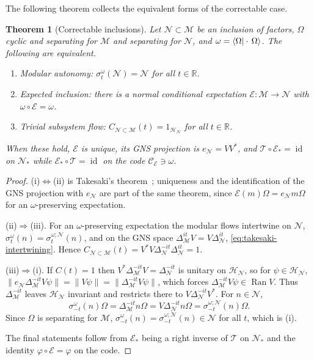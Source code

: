 \documentclass[a4paper,11pt]{article}
\newtheorem{theorem}{Theorem}
\theoremstyle{definition}
\newcommand{\mN}{\mathcal{N}}
\newcommand{\mH}{\mathcal{H}}
\newcommand{\mM}{\mathcal{M}}
\newcommand{\mE}{\mathcal{E}}
\begin{document}
The following theorem collects the equivalent forms of the correctable case.
\begin{theorem}[Correctable inclusions]\label{thm:correctable}
Let $\mN\subset\mM$ be an inclusion of factors, $\Omega$ cyclic and separating for $\mM$ and separating for $\mN$, and $\omega=\braket{\Omega|\cdot\,\Omega}$. The following are equivalent.
\begin{enumerate}
 \item[\rm(i)] \emph{Modular autonomy:} $\sigma^{\omega}_t(\mN)=\mN$ for all $t\in\mathbb R$.
 \item[\rm(ii)] \emph{Expected inclusion:} there is a normal conditional expectation $\mE:\mM\to\mN$ with $\omega\circ\mE=\omega$.
 \item[\rm(iii)] \emph{Trivial subsystem flow:} $C_{\mN\subset\mM}(t)=1_{\mH_{\mN}}$ for all $t\in\mathbb R$.
\end{enumerate}
When these hold, $\mE$ is unique, its GNS projection is $e_{\mN}=VV^*$, and $\mathcal T\circ\mE_*=\operatorname{id}$ on $\mN_*$ while $\mE_*\circ\mathcal T=\operatorname{id}$ on the code $\mathcal C_{\mE}\ni\omega$.
\end{theorem}

\begin{proof}
(i)$\Leftrightarrow$(ii) is Takesaki's theorem~\cite{Takesaki1972}; uniqueness and the identification of the GNS projection with $e_{\mN}$ are part of the same theorem, since $\mE(m)\Omega=e_{\mN}m\Omega$ for an $\omega$-preserving expectation.

(ii)$\Rightarrow$(iii). For an $\omega$-preserving expectation the modular flows intertwine on $\mN$,
$\sigma^{\omega}_t(n)=\sigma^{\omega;\mN}_t(n)$, and on the GNS space
$\Delta_{\mM}^{it}V=V\Delta_{\mN}^{it}$, \eqref{eq:takesaki-intertwining}. Hence
$C_{\mN\subset\mM}(t)=V^*V\Delta_{\mN}^{-it}\Delta_{\mN}^{it}=1$.

(iii)$\Rightarrow$(i). If $C(t)=1$ then $V^*\Delta_{\mM}^{-it}V=\Delta_{\mN}^{-it}$ is unitary on $\mH_{\mN}$, so for $\psi\in\mH_{\mN}$,
$\|e_{\mN}\Delta_{\mM}^{-it}V\psi\|=\|V\psi\|=\|\Delta_{\mM}^{-it}V\psi\|$,
which forces $\Delta_{\mM}^{-it}V\psi\in\operatorname{Ran}V$. Thus $\Delta_{\mM}^{-it}$ leaves $\mH_{\mN}$ invariant and restricts there to $V\Delta_{\mN}^{-it}V^*$. For $n\in\mN$,
\[
 \sigma^{\omega}_{-t}(n)\Omega=\Delta_{\mM}^{-it}n\Omega
 =V\Delta_{\mN}^{-it}n\Omega=\sigma^{\omega;\mN}_{-t}(n)\Omega .
\]
Since $\Omega$ is separating for $\mM$, $\sigma^{\omega}_{-t}(n)=\sigma^{\omega;\mN}_{-t}(n)\in\mN$ for all $t$, which is (i).

The final statements follow from $\mE_*$ being a right inverse of $\mathcal T$ on $\mN_*$ and the identity $\varphi\circ\mE=\varphi$ on the code.
\end{proof}
\end{document}
